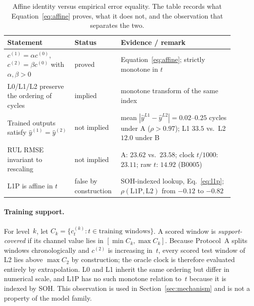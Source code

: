 \documentclass[preprint,12pt]{elsarticle}
\begin{document}
\begin{table}[htbp]
\centering
\footnotesize
\caption{Affine identity versus empirical error equality. The table records what Equation~\eqref{eq:affine} proves, what it does not, and the observation that separates the two.}
\label{tab:affine}
\setlength{\tabcolsep}{4pt}
\begin{tabular}{@{}>{\raggedright\arraybackslash}p{0.28\linewidth}>{\raggedright\arraybackslash}p{0.17\linewidth}>{\raggedright\arraybackslash}p{0.47\linewidth}@{}}
\toprule
Statement & Status & Evidence / remark \\
\midrule
$c^{(1)}=\alpha c^{(0)}$, $c^{(2)}=\beta c^{(0)}$ with $\alpha,\beta>0$ & proved & Equation~\eqref{eq:affine}; strictly monotone in $t$ \\
L0/L1/L2 preserve the ordering of cycles & implied & monotone transform of the same index \\
Trained outputs satisfy $\hat y^{(1)}=\hat y^{(2)}$ & not implied & mean $|\hat y^{L1}-\hat y^{L2}|=0.02$--$0.25$ cycles under A ($\rho>0.97$); L1 $33.5$ vs.\ L2 $12.0$ under B \\
RUL RMSE invariant to rescaling & not implied & A: $23.62$ vs.\ $23.58$; clock $t/1000$: $23.11$; raw $t$: $14.92$ (B0005) \\
L1P is affine in $t$ & false by construction & SOH-indexed lookup, Eq.~\eqref{eq:l1p}; $\rho(\mathrm{L1P},\mathrm{L2})$ from $-0.12$ to $-0.82$ \\
\bottomrule
\end{tabular}
\end{table}

\paragraph{Training support.}
For level~$k$, let $C_k=\{c_t^{(k)}: t\in\text{training windows}\}$.
A scored window is \emph{support-covered} if its channel value lies in $[\min C_k,\max C_k]$.
Because Protocol~A splits windows chronologically and $c^{(2)}$ is increasing in~$t$, every scored test window of L2 lies above $\max C_2$ by construction; the oracle clock is therefore evaluated entirely by extrapolation.
L0 and L1 inherit the same ordering but differ in numerical scale, and L1P has no such monotone relation to~$t$ because it is indexed by SOH.
This observation is used in Section~\ref{sec:mechanism} and is not a property of the model family.
\end{document}
